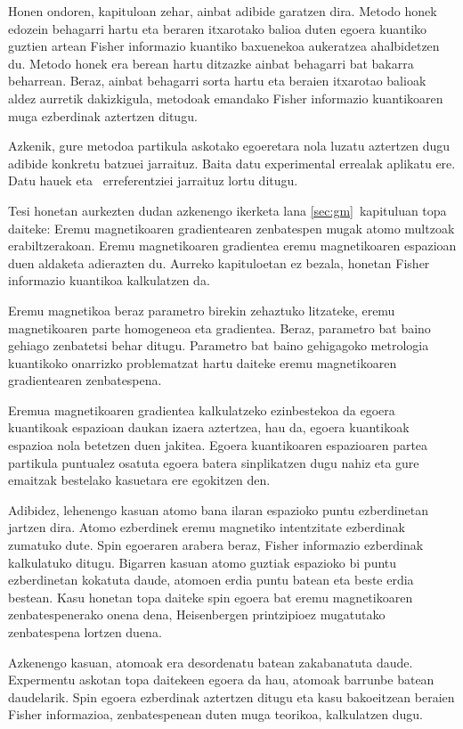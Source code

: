 Honen ondoren, kapituloan zehar, ainbat adibide garatzen dira.
Metodo honek edozein behagarri hartu eta beraren itxarotako balioa duten egoera kuantiko guztien artean Fisher informazio kuantiko baxuenekoa aukeratzea ahalbidetzen du.
Metodo honek era berean hartu ditzazke ainbat behagarri bat bakarra beharrean.
Beraz, ainbat behagarri sorta hartu eta beraien itxarotao balioak aldez aurretik dakizkigula, metodoak emandako Fisher informazio kuantikoaren muga ezberdinak aztertzen ditugu.

Azkenik, gure metodoa partikula askotako egoeretara nola luzatu aztertzen dugu adibide konkretu batzuei jarraituz.
Baita datu experimental errealak aplikatu ere.
Datu hauek \cite{Luecke2014} eta \cite{Gross2010}~erreferentziei jarraituz lortu ditugu.

Tesi honetan aurkezten dudan azkenengo ikerketa lana \ref{sec:gm}~kapituluan topa daiteke: Eremu magnetikoaren gradientearen zenbatespen mugak atomo multzoak erabiltzerakoan.
Eremu magnetikoaren gradientea eremu magnetikoaren espazioan duen aldaketa adierazten du.
Aurreko kapituloetan ez bezala, honetan Fisher informazio kuantikoa kalkulatzen da.

Eremu magnetikoa beraz parametro birekin zehaztuko litzateke, eremu magnetikoaren parte homogeneoa eta gradientea.
Beraz, parametro bat baino gehiago zenbatetsi behar ditugu.
Parametro bat baino gehigagoko metrologia kuantikoko onarrizko problematzat hartu daiteke eremu magnetikoaren gradientearen zenbatespena.

Eremua magnetikoaren gradientea kalkulatzeko ezinbestekoa da egoera kuantikoak espazioan daukan izaera aztertzea, hau da, egoera kuantikoak espazioa nola betetzen duen jakitea.
Egoera kuantikoaren espazioaren partea partikula puntualez osatuta egoera batera sinplikatzen dugu nahiz eta gure emaitzak bestelako kasuetara ere egokitzen den.

Adibidez, lehenengo kasuan atomo bana ilaran espazioko puntu ezberdinetan jartzen dira.
Atomo ezberdinek eremu magnetiko intentzitate ezberdinak zumatuko dute.
Spin egoeraren arabera beraz, Fisher informazio ezberdinak kalkulatuko ditugu.
Bigarren kasuan atomo guztiak espazioko bi puntu ezberdinetan kokatuta daude, atomoen erdia puntu batean eta beste erdia bestean.
Kasu honetan topa daiteke spin egoera bat eremu magnetikoaren zenbatespenerako onena dena, Heisenbergen printzipioez mugatutako zenbatespena lortzen duena.

Azkenengo kasuan, atomoak era desordenatu batean zakabanatuta daude.
Expermentu askotan topa daitekeen egoera da hau, atomoak barrunbe batean daudelarik.
Spin egoera ezberdinak aztertzen ditugu eta kasu bakoeitzean beraien Fisher informazioa, zenbatespenean duten muga teorikoa, kalkulatzen dugu.

